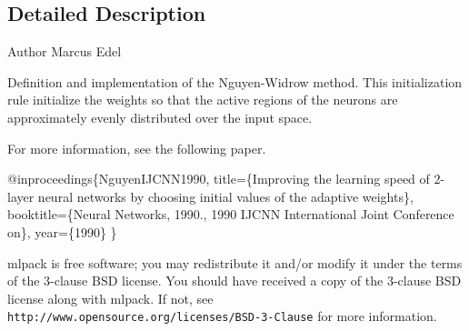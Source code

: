 \subsection{Detailed Description}
\begin{DoxyAuthor}{Author}
Marcus Edel
\end{DoxyAuthor}
Definition and implementation of the Nguyen-\/\+Widrow method. This initialization rule initialize the weights so that the active regions of the neurons are approximately evenly distributed over the input space.

For more information, see the following paper.


\begin{DoxyCode}
@inproceedings\{NguyenIJCNN1990,
  title=\{Improving the learning speed of 2-layer neural networks by choosing
  initial values of the adaptive weights\},
  booktitle=\{Neural Networks, 1990., 1990 IJCNN International Joint
  Conference on\},
  year=\{1990\}
\}
\end{DoxyCode}


mlpack is free software; you may redistribute it and/or modify it under the terms of the 3-\/clause B\+SD license. You should have received a copy of the 3-\/clause B\+SD license along with mlpack. If not, see {\tt http\+://www.\+opensource.\+org/licenses/\+B\+S\+D-\/3-\/\+Clause} for more information. 